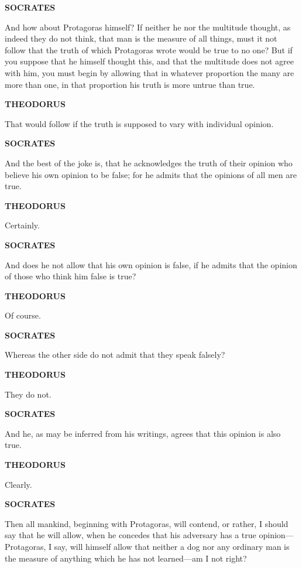 \documentclass[11pt,letter]{article}
\begin{document}
\par \textbf{SOCRATES}
\par   And how about Protagoras himself? If neither he nor the multitude thought, as indeed they do not think, that man is the measure of all things, must it not follow that the truth of which Protagoras wrote would be true to no one? But if you suppose that he himself thought this, and that the multitude does not agree with him, you must begin by allowing that in whatever proportion the many are more than one, in that proportion his truth is more untrue than true.

\par \textbf{THEODORUS}
\par   That would follow if the truth is supposed to vary with individual opinion.

\par \textbf{SOCRATES}
\par   And the best of the joke is, that he acknowledges the truth of their opinion who believe his own opinion to be false; for he admits that the opinions of all men are true.

\par \textbf{THEODORUS}
\par   Certainly.

\par \textbf{SOCRATES}
\par   And does he not allow that his own opinion is false, if he admits that the opinion of those who think him false is true?

\par \textbf{THEODORUS}
\par   Of course.

\par \textbf{SOCRATES}
\par   Whereas the other side do not admit that they speak falsely?

\par \textbf{THEODORUS}
\par   They do not.

\par \textbf{SOCRATES}
\par   And he, as may be inferred from his writings, agrees that this opinion is also true.

\par \textbf{THEODORUS}
\par   Clearly.

\par \textbf{SOCRATES}
\par   Then all mankind, beginning with Protagoras, will contend, or rather, I should say that he will allow, when he concedes that his adversary has a true opinion—Protagoras, I say, will himself allow that neither a dog nor any ordinary man is the measure of anything which he has not learned—am I not right?
\end{document}
